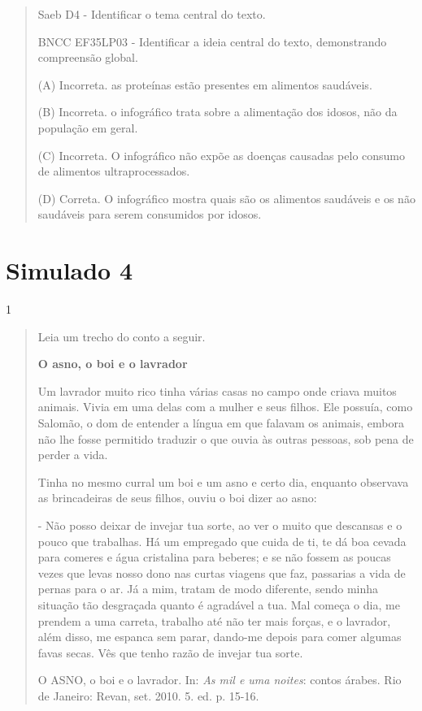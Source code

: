 \begin{itemize}
{{{\begin{itemize}
\begin{itemize}
\begin{itemize}
\begin{quote}
Saeb D4 - Identificar o tema central do texto.

BNCC EF35LP03 - Identificar a ideia central do texto, demonstrando
compreensão global.

(A) Incorreta. as proteínas estão presentes em alimentos saudáveis.

(B) Incorreta. o infográfico trata sobre a alimentação dos idosos, não
da população em geral.

(C) Incorreta. O infográfico não expõe as doenças causadas pelo consumo
de alimentos ultraprocessados.

(D) Correta. O infográfico mostra quais são os alimentos saudáveis e os
não saudáveis para serem consumidos por idosos.
\end{quote}

\chapter{Simulado 4}

\num{1}

\begin{quote}
Leia um trecho do conto a seguir.

\textbf{O asno, o boi e o lavrador}

Um lavrador muito rico tinha várias casas no campo onde criava muitos
animais. Vivia em uma delas com a mulher e seus filhos. Ele possuía,
como Salomão, o dom de entender a língua em que falavam os animais,
embora não lhe fosse permitido traduzir o que ouvia às outras pessoas,
sob pena de perder a vida.

Tinha no mesmo curral um boi e um asno e certo dia, enquanto observava
as brincadeiras de seus filhos, ouviu o boi dizer ao asno:

- Não posso deixar de invejar tua sorte, ao ver o muito que descansas e
o pouco que trabalhas. Há um empregado que cuida de ti, te dá boa cevada
para comeres e água cristalina para beberes; e se não fossem as poucas
vezes que levas nosso dono nas curtas viagens que faz, passarias a vida
de pernas para o ar. Já a mim, tratam de modo diferente, sendo minha
situação tão desgraçada quanto é agradável a tua. Mal começa o dia, me
prendem a uma carreta, trabalho até não ter mais forças, e o lavrador,
além disso, me espanca sem parar, dando-me depois para comer algumas
favas secas. Vês que tenho razão de invejar tua sorte.

O ASNO, o boi e o lavrador. In: \emph{As mil e uma noites}: contos
árabes. Rio de Janeiro: Revan, set. 2010. 5. ed. p. 15-16.


\end{quote}
\end{itemize}
\end{itemize}
\end{itemize}}}}
\end{itemize}
